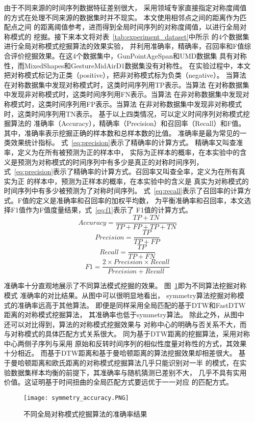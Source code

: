 由于不同来源的时间序列数据特征差别很大，
采用领域专家直接指定对称度阈值的方式在处理不同来源的数据集时并不现实。
本文使用相邻点之间的距离作为匹配点之间
的距离阈值参考，进而得到全局时间序列的对称度阈值，以进行全局对称模式的
挖掘。接下来本文将对表~\ref{tab:experiment_dataset}中所示
的4个数据集进行全局对称模式挖掘算法的效果实验，
并利用准确率，精确率，召回率和F值综合评价挖掘效果。在这4个数据集中，GunPointAgeSpan和UMD数据集
具有对称性，而MixedShapes和GestureMidAirD1数据集没有对称性。
在实验过程中，本文把对称模式标记为正类（positive），把非对称模式标为负类（negative）。
当算法在对称数据集中发现对称模式时，这类时间序列用TP表示。当算法
在对称数据集中发现非对称模式时，这类时间序列用FN表示。当算法
在非对称数据集中发现对称模式时，这类时间序列用FP表示。当算法
在非对称数据集中发现非对称模式时，这类时间序列用TN表示。
基于以上四类情况，可以定义时间序列对称模式挖掘算法的
准确率（Accuracy），精确率（Precision）和召回率（Recall）和F值。
其中，准确率表示挖掘正确的样本数和总样本数的比值。
准确率是最为常见的一类效果统计指标。
式~\ref{eq:precision}表示了精确率的计算方式。
精确率又叫查准率，定义为在所有被预测为正的样本中，
实际为正样本的概率，在本实验中的含义是预测为对称模式的时间序列中有多少是真正的对称时间序列，
式~\ref{eq:precision}表示了精确率的计算方式。召回率又叫查全率，定义为在所有真实为正
的样本中，预测为正样本的概率，在本实验中的含义是
真实为对称模式的时间序列中有多少被预测为了对称时间序列。
式~\ref{eq:recall}表示了召回率的计算方式。F值的定义是准确率和召回率的加权平均数，
为平衡准确率和召回率，本文选择F1值作为F值度量结果，式~\ref{eq:f1}表示了
F1值的计算方式。
\begin{equation}
  Accuracy=\frac{TP+TN}{TP+FP+TP+TN}
  \label{eq:Accuracy}
\end{equation}
\begin{equation}
  Precision=\frac{TP}{TP+FP}
  \label{eq:precision}
\end{equation}
\begin{equation}
  Recall=\frac{TP}{TP+FN}
  \label{eq:recall}
\end{equation}
\begin{equation}
  F1=\frac{2 \times Precision \times Recall}{Precision+Recall}
  \label{eq:f1}
\end{equation}

准确率十分直观地展示了不同算法模式挖掘的效果。
图~\ref{fig:accuracy_compare}即为不同算法挖掘对称模式
准确率的对比结果。从图中可以很明显地看出，
symmetry算法挖掘对称模式的准确率远高于其他算法。
即便是同样采用全局匹配的基于DTW和FastDTW距离的对称模式挖掘算法，
其准确率也低于symmetry算法。
除此之外，从图中还可以对比得到，算法的对称模式挖掘效果与
对称中心的明确与否关系不大，而与对称模式的具体匹配方式关系很大。
同为基于DTW距离的挖掘算法，采用对称中心两侧子序列与采用
原始和反转时间序列的相似性度量对称性的方式，其效果十分相近。
而基于DTW距离和基于曼哈顿距离的算法挖掘效果却相差很大。
基于曼哈顿距离和欧氏距离的对称模式挖掘算法几乎只能识别对一半
的模式，在实验数据集样本均衡的前提下，其准确率与随机猜测已差别不大，
几乎不具有实用价值。这证明基于时间扭曲的全局匹配方式要远优于一一对应
的匹配方式。
\begin{figure}
  \centering
  \texttt{[image: symmetry\_accuracy.PNG]}
  \caption{不同全局对称模式挖掘算法的准确率结果}
  \label{fig:accuracy_compare}
\end{figure}

